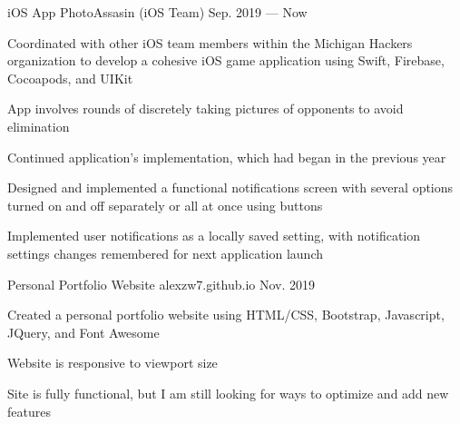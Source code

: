 

\begin{cventries}

  \cventry
    {iOS App} 
    {PhotoAssasin (iOS Team)} 
    {Sep. 2019 — Now} 
    {} 
    {
      \begin{cvitems} %
        \item {Coordinated with other iOS team members within the Michigan Hackers organization to develop a cohesive iOS game application
        using Swift, Firebase, Cocoapods, and UIKit}
        \item {App involves rounds of discretely taking pictures of opponents to avoid elimination}
        \item {Continued application's implementation, which had began in the previous year}
        \item {Designed and implemented a functional notifications screen with several options turned on and off separately or all at once using buttons}
        \item {Implemented user notifications as a locally saved setting, with notification settings changes remembered for next application launch}
      \end{cvitems}
    }

  \cventry
    {Personal Portfolio Website} 
    {alexzw7.github.io} 
    {Nov. 2019} 
    {} 
    {
      \begin{cvitems} %
        \item {Created a personal portfolio website using HTML/CSS, Bootstrap, Javascript, JQuery, and Font Awesome}
        \item {Website is responsive to viewport size}
        \item {Site is fully functional, but I am still looking for ways to optimize and add new features}
      \end{cvitems}
    }


\end{cventries}
